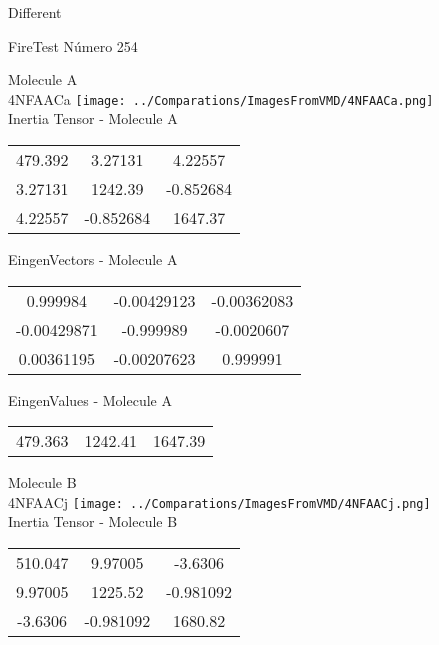 \begin{center}
\vtab
\vtab
\textcolor{NavyBlue}{\Large Different}
\end{center}

 \newpage

\vtab[-2cm]
\begin{center}
{\large FireTest \tab Número 254}
\end{center}
\begin{multicols}{2}
\begin{center}

Molecule A \\ 
4NFAACa
\texttt{[image: ../Comparations/ImagesFromVMD/4NFAACa.png]}
\\
Inertia Tensor - Molecule A \\
\vtab

\begin{tabular}{|c c c|}
479.392	 & 	3.27131	 & 	4.22557	 \\
3.27131	 & 	1242.39	 & 	-0.852684	 \\
4.22557	 & 	-0.852684	 & 	1647.37
\end{tabular}

\vtab
 EingenVectors - Molecule A     \\
\vtab
\begin{tabular}{|c c c|}
0.999984	 & 	-0.00429123	 & 	-0.00362083	 \\
-0.00429871	 & 	-0.999989	 & 	-0.0020607	 \\
0.00361195	 & 	-0.00207623	 & 	0.999991
\end{tabular}

\vtab
 EingenValues - Molecule A     \\
\vtab
\begin{tabular}{|c c c|}
479.363	 & 	1242.41	 & 	1647.39	 \\
\end{tabular}
\columnbreak

Molecule B \\ 
4NFAACj
\texttt{[image: ../Comparations/ImagesFromVMD/4NFAACj.png]}
\\
Inertia Tensor - Molecule B \\
\vtab

\begin{tabular}{|c c c|}
510.047	 & 	9.97005	 & 	-3.6306	 \\
9.97005	 & 	1225.52	 & 	-0.981092	 \\
-3.6306	 & 	-0.981092	 & 	1680.82
\end{tabular}


\end{center}
\end{multicols}
